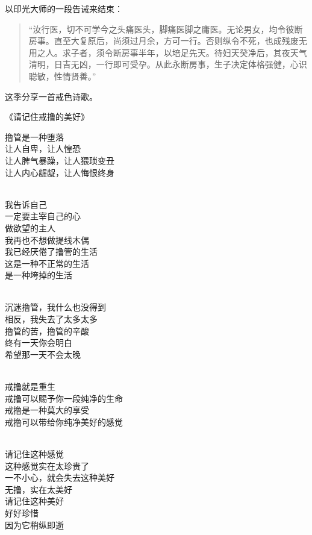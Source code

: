 以印光大师的一段告诫来结束：

\begin{quote}
    “汝行医，切不可学今之头痛医头，脚痛医脚之庸医。无论男女，均令彼断房事。直至大复原后，尚须过月余，方可一行。否则纵令不死，也成残废无用之人。求子者，须令断房事半年，以培足先天。待妇天癸净后，其夜天气清明，日吉无凶，一行即可受孕。从此永断房事，生子决定体格强健，心识聪敏，性情贤善。”
\end{quote}

这季分享一首戒色诗歌。

\begin{center}
    《请记住戒撸的美好》\it
    \begin{multicols}{2}
        撸管是一种堕落 \\ 让人自卑，让人惶恐 \\ 让人脾气暴躁，让人猥琐变丑 \\ 让人内心龌龊，让人悔恨终身

        ~\\

        我告诉自己 \\ 一定要主宰自己的心 \\ 做欲望的主人 \\ 我再也不想做提线木偶 \\ 我已经厌倦了撸管的生活 \\ 这是一种不正常的生活 \\ 是一种垮掉的生活

        ~\\

        沉迷撸管，我什么也没得到 \\ 相反，我失去了太多太多 \\ 撸管的苦，撸管的辛酸 \\ 终有一天你会明白 \\ 希望那一天不会太晚

        ~\\

        戒撸就是重生 \\ 戒撸可以赐予你一段纯净的生命 \\ 戒撸是一种莫大的享受 \\ 戒撸可以带给你纯净美好的感觉

        ~\\

        请记住这种感觉 \\ 这种感觉实在太珍贵了 \\ 一不小心，就会失去这种美好 \\ 无撸，实在太美好 \\ 请记住这种美好 \\ 好好珍惜 \\ 因为它稍纵即逝
    \end{multicols}
\end{center}


